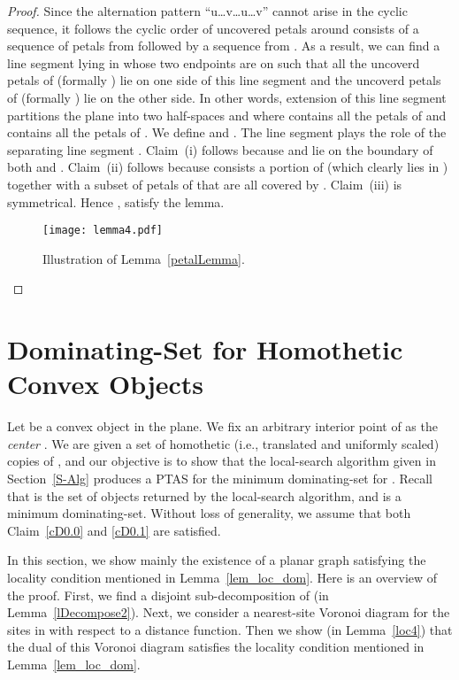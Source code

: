 \documentclass[a4paper,11pt]{article}
\begin{document}
\begin{proof}
Since the alternation pattern ``u\dots v\dots u\dots v” cannot arise in the cyclic sequence, it follows the cyclic order of uncovered petals around  consists of a sequence of petals from  followed by a sequence from . As a result, we can find a line segment    lying 
in  whose two endpoints are on  such that all the uncoverd petals of   (formally ) lie on one side of this line segment and the uncoverd petals of   (formally ) lie on the other side. 
In other words, extension of this line segment  partitions the plane into two half-spaces  and  where  contains all the petals of  and  contains all the petals of . 
We define  and . 
The line segment    plays the role of the separating line segment . 
Claim~(i) follows because  and   lie on the boundary of both  and . Claim~(ii) follows because  consists a portion of  (which clearly lies in ) together with a subset of petals of  that are all covered by  . Claim~(iii) is symmetrical. Hence ,  satisfy the lemma. 
\begin{figure}
  \centering
   \texttt{[image: lemma4.pdf]}
   \caption{Illustration
   of Lemma~\ref{petalLemma}.}
   \label{fig_petalLemma}
\end{figure}
 \end{proof}


\section{Dominating-Set for Homothetic Convex Objects}\label{convPoly}
 
Let  be a convex object in the plane.  We fix an arbitrary interior point of  as 
the   {\it center}  . We are given a 
set  of  homothetic (i.e., translated and uniformly scaled) copies of , 
and our objective is to show that  the local-search algorithm given in Section~\ref{S-Alg} produces a PTAS for the minimum dominating-set for . 
Recall that   is  the set of objects returned by the  local-search algorithm, and   is a minimum dominating-set. Without loss of generality, we assume that   both Claim~\ref{cD0.0} and \ref{cD0.1} are satisfied.  

In this section, we show mainly the existence of a planar graph 
satisfying the locality condition mentioned in Lemma~\ref{lem_loc_dom}.  Here is an overview of the proof.
First, we  find a disjoint sub-decomposition  of  (in Lemma~\ref{lDecompose2}).
Next, we  consider a nearest-site Voronoi diagram for the sites in  with respect to a distance function.
Then we show (in Lemma~\ref{loc4}) that the dual of this  Voronoi diagram satisfies the locality condition mentioned in Lemma~\ref{lem_loc_dom}.  
\end{document}
